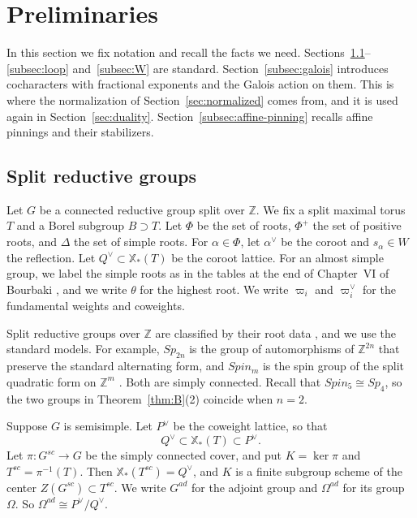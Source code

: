 \documentclass[psamsfonts]{amsart}
\theoremstyle{definition}
\theoremstyle{remark}
\numberwithin{equation}{section}
\newcommand{\Z}{\mathbb{Z}}   %
\newcommand{\X}{\mathbb{X}}
\newcommand{\ra}{\rightarrow}
\numberwithin{equation}{section}
\newcommand{\Om}{\Omega}
\theoremstyle{plain}
\begin{document}
\section{Preliminaries}\label{sec:prelim}

In this section we fix notation and recall the facts we need. Sections~\ref{subsec:groups}--\ref{subsec:loop} and~\ref{subsec:W} are standard. Section~\ref{subsec:galois} introduces cocharacters with fractional exponents and the Galois action on them. This is where the normalization of Section~\ref{sec:normalized} comes from, and it is used again in Section~\ref{sec:duality}. Section~\ref{subsec:affine-pinning} recalls affine pinnings and their stabilizers.

\subsection{Split reductive groups}\label{subsec:groups}
Let $G$ be a connected reductive group split over $\Z$. We fix a split maximal torus $T$ and a Borel subgroup $B\supset T$. Let $\Phi$ be the set of roots, $\Phi^+$ the set of positive roots, and $\Delta$ the set of simple roots. For $\alpha\in\Phi$, let $\alpha^\vee$ be the coroot and $s_\alpha\in W$ the reflection. Let $Q^\vee\subset\X_*(T)$ be the coroot lattice. For an almost simple group, we label the simple roots as in the tables at the end of Chapter~VI of Bourbaki \cite[Plates~I--IX]{Bou02}, and we write $\theta$ for the highest root. We write $\varpi_i$ and $\varpi_i^\vee$ for the fundamental weights and coweights.

Split reductive groups over $\Z$ are classified by their root data \cite[Exp.~XXV]{SGA3}, and we use the standard models. For example, $Sp_{2n}$ is the group of automorphisms of $\Z^{2n}$ that preserve the standard alternating form, and $Spin_m$ is the spin group of the split quadratic form on $\Z^m$ \cite[Appendix~C]{Con14}. Both are simply connected. Recall that $Spin_5\cong Sp_4$, so the two groups in Theorem~\ref{thm:B}(2) coincide when $n=2$.

Suppose $G$ is semisimple. Let $P^\vee$ be the coweight lattice, so that
\[
Q^\vee\subset\X_*(T)\subset P^\vee.
\]
Let $\pi\colon G^{sc}\ra G$ be the simply connected cover, and put $K=\ker\pi$ and $T^{sc}=\pi^{-1}(T)$. Then $\X_*(T^{sc})=Q^\vee$, and $K$ is a finite subgroup scheme of the center $Z(G^{sc})\subset T^{sc}$. We write $G^{ad}$ for the adjoint group and $\Om^{ad}$ for its group $\Om$. So $\Om^{ad}\cong P^\vee/Q^\vee$.
\end{document}
